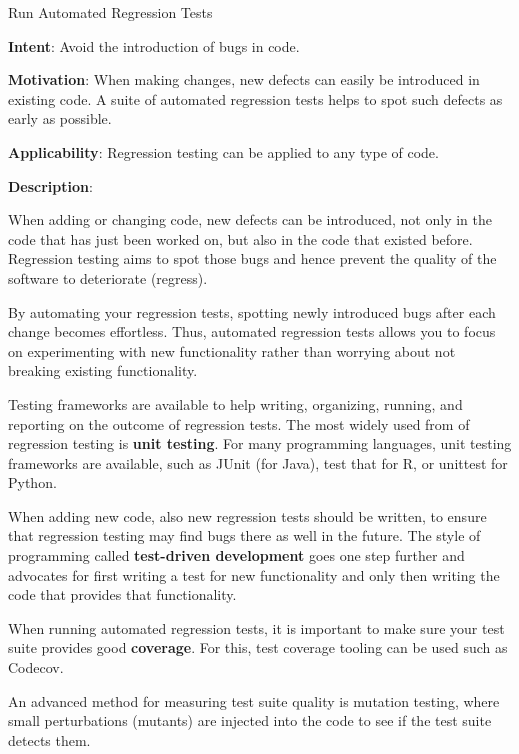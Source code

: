   
  \begin{frame}[plain]{ Run Automated Regression Tests
 }

  \textbf{Intent}: Avoid the introduction of bugs in code. 
 

  \textbf{Motivation}: When making changes, new defects can easily be introduced in existing code. A suite of automated regression tests helps to spot such defects as early as possible. 
 

  \textbf{Applicability}: Regression testing can be applied to any type of code. 
 

  \textbf{Description}: 

When adding or changing code, new defects can be introduced, not only in the code that has just been worked on, but also in the code that existed before. Regression testing aims to spot those bugs and hence prevent the quality of the software to deteriorate (regress).


By automating your regression tests, spotting newly introduced bugs after each change becomes effortless. Thus, automated regression tests allows you to focus on experimenting with new functionality rather than worrying about not breaking existing functionality.


Testing frameworks are available to help writing, organizing, running, and reporting on the outcome of regression tests. The most widely used from of regression testing is \textbf{unit testing}. For many programming languages, unit testing frameworks are available, such as JUnit (for Java), test that for R, or unittest for Python.


When adding new code, also new regression tests should be written, to ensure that regression testing may find bugs there as well in the future. The style of programming called \textbf{test-driven development} goes one step further and advocates for first writing a test for new functionality and only then writing the code that provides that functionality.


When running automated regression tests, it is important to make sure your test suite provides good \textbf{coverage}. For this, test coverage tooling can be used such as Codecov.


An advanced method for measuring test suite quality is mutation testing, where small perturbations (mutants) are injected into the code to see if the test suite detects them.


 


  \end{frame}

